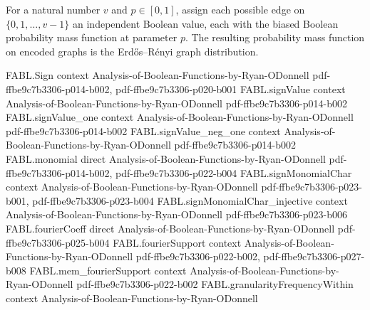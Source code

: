 \begin{definition}
\label{FABL.erdosRenyiPMF}
\leanok
{}
For a natural number $v$ and $p\in[0,1]$, assign each possible edge on
$\{0,1,\ldots,v-1\}$ an independent Boolean value, each with the biased Boolean
probability mass function at parameter $p$. The resulting probability mass function on
encoded graphs is the Erdős–Rényi graph distribution.
\end{definition}

\begin{theorem}
\label{FABL.graphProperty_invariant}
\leanok
{}
\proofstep
  {FABL.Sign}
  {context}
  {Analysis-of-Boolean-Functions-by-Ryan-ODonnell}
  {pdf-ffbe9c7b3306-p014-b002,
    pdf-ffbe9c7b3306-p020-b001}
\proofstep
  {FABL.signValue}
  {context}
  {Analysis-of-Boolean-Functions-by-Ryan-ODonnell}
  {pdf-ffbe9c7b3306-p014-b002}
\proofstep
  {FABL.signValue_one}
  {context}
  {Analysis-of-Boolean-Functions-by-Ryan-ODonnell}
  {pdf-ffbe9c7b3306-p014-b002}
\proofstep
  {FABL.signValue_neg_one}
  {context}
  {Analysis-of-Boolean-Functions-by-Ryan-ODonnell}
  {pdf-ffbe9c7b3306-p014-b002}
\proofstep
  {FABL.monomial}
  {direct}
  {Analysis-of-Boolean-Functions-by-Ryan-ODonnell}
  {pdf-ffbe9c7b3306-p014-b002,
    pdf-ffbe9c7b3306-p022-b004}
\proofstep
  {FABL.signMonomialChar}
  {context}
  {Analysis-of-Boolean-Functions-by-Ryan-ODonnell}
  {pdf-ffbe9c7b3306-p023-b001,
    pdf-ffbe9c7b3306-p023-b004}
\proofstep
  {FABL.signMonomialChar_injective}
  {context}
  {Analysis-of-Boolean-Functions-by-Ryan-ODonnell}
  {pdf-ffbe9c7b3306-p023-b006}
\proofstep
  {FABL.fourierCoeff}
  {direct}
  {Analysis-of-Boolean-Functions-by-Ryan-ODonnell}
  {pdf-ffbe9c7b3306-p025-b004}
\proofstep
  {FABL.fourierSupport}
  {context}
  {Analysis-of-Boolean-Functions-by-Ryan-ODonnell}
  {pdf-ffbe9c7b3306-p022-b002,
    pdf-ffbe9c7b3306-p027-b008}
\proofstep
  {FABL.mem_fourierSupport}
  {context}
  {Analysis-of-Boolean-Functions-by-Ryan-ODonnell}
  {pdf-ffbe9c7b3306-p022-b002}
\proofstep
  {FABL.granularityFrequencyWithin}
  {context}
  {Analysis-of-Boolean-Functions-by-Ryan-ODonnell}

\end{theorem}

